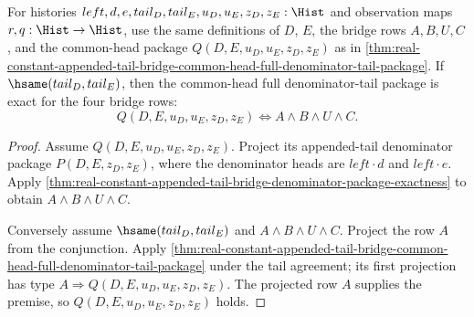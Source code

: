 \begin{theorem}
\label{thm:real-constant-appended-tail-bridge-common-head-full-denominator-tail-package-exactness}
For histories $left,d,e,tail_D,tail_E,u_D,u_E,z_D,z_E:\Hist$ and observation
maps $r,q:\Hist\to\Hist$, use the same definitions of $D$, $E$, the bridge
rows $A,B,U,C$, and the common-head package $Q(D,E,u_D,u_E,z_D,z_E)$ as in
\autoref{thm:real-constant-appended-tail-bridge-common-head-full-denominator-tail-package}.
If $\hsame(tail_D,tail_E)$, then the common-head full denominator-tail package
is exact for the four bridge rows:
$$
Q(D,E,u_D,u_E,z_D,z_E)\Longleftrightarrow A\land B\land U\land C.
$$
\end{theorem}
\begin{proof}
Assume $Q(D,E,u_D,u_E,z_D,z_E)$. Project its appended-tail denominator package
$P(D,E,z_D,z_E)$, where the denominator heads are $left\cdot d$ and
$left\cdot e$. Apply
\autoref{thm:real-constant-appended-tail-bridge-denominator-package-exactness}
to obtain $A\land B\land U\land C$.

Conversely assume $\hsame(tail_D,tail_E)$ and $A\land B\land U\land C$.
Project the row $A$ from the conjunction. Apply
\autoref{thm:real-constant-appended-tail-bridge-common-head-full-denominator-tail-package}
under the tail agreement; its first projection has type
$A\Longrightarrow Q(D,E,u_D,u_E,z_D,z_E)$. The projected row $A$ supplies the
premise, so $Q(D,E,u_D,u_E,z_D,z_E)$ holds.
\end{proof}

